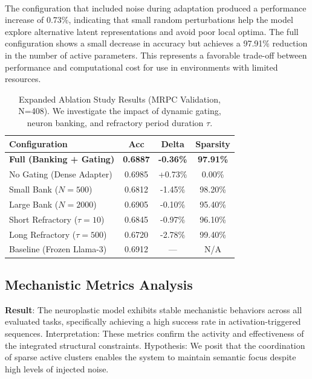 \documentclass[11pt, letterpaper]{article}
\begin{document}
\paragraph{}
The configuration that included noise during adaptation produced a performance increase of 0.73\%, indicating that small random perturbations help the model explore alternative latent representations and avoid poor local optima. The full configuration shows a small decrease in accuracy but achieves a 97.91\% reduction in the number of active parameters. This represents a favorable trade-off between performance and computational cost for use in environments with limited resources.

\begin{table}[htbp]
    \centering
    \caption{Expanded Ablation Study Results (MRPC Validation, N=408). We investigate the impact of dynamic gating, neuron banking, and refractory period duration $\tau$.}
    \label{tab:ablation}
    \begin{tabular}{l c c c}
        \toprule
        \textbf{Configuration} & \textbf{Acc} & \textbf{Delta} & \textbf{Sparsity} \\
        \midrule
        \textbf{Full (Banking + Gating)} & \textbf{0.6887} & \textbf{-0.36\%} & \textbf{97.91\%} \\
        No Gating (Dense Adapter) & 0.6985 & +0.73\% & 0.00\% \\
        Small Bank ($N=500$) & 0.6812 & -1.45\% & 98.20\% \\
        Large Bank ($N=2000$) & 0.6905 & -0.10\% & 95.40\% \\
        Short Refractory ($\tau=10$) & 0.6845 & -0.97\% & 96.10\% \\
        Long Refractory ($\tau=500$) & 0.6720 & -2.78\% & 99.40\% \\
        Baseline (Frozen Llama-3) & 0.6912 & --- & N/A \\
        \bottomrule
    \end{tabular}
\end{table}

\subsection{Mechanistic Metrics Analysis}
\textbf{Result}: The neuroplastic model exhibits stable mechanistic behaviors across all evaluated tasks, specifically achieving a high success rate in activation-triggered sequences. Interpretation: These metrics confirm the activity and effectiveness of the integrated structural constraints. Hypothesis: We posit that the coordination of sparse active clusters enables the system to maintain semantic focus despite high levels of injected noise.
\end{document}
